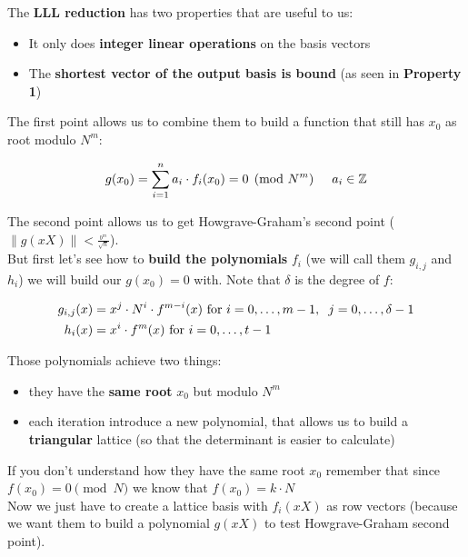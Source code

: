 \documentclass[a4paper,11pt]{article}
\begin{document}
The \textbf{LLL reduction} has two properties that are useful to us:
\begin{itemize}
	\item{It only does \textbf{integer linear operations} on the basis vectors}
	\item{The \textbf{shortest vector of the output basis is bound} (as seen in \textbf{Property 1})}\\
\end{itemize}
The first point allows us to combine them to build a function that still has $x_0$ as root modulo $N^m$:

\[ g(x_0) = \sum^n_{i=1}a_i\cdot f_i(x_0) = 0 \pmod{N^m}\hspace{5mm} a_i \in \mathbb{Z} \]

The second point allows us to get Howgrave-Graham's second point ($\|g(xX)\| < \frac{_{b^m}}{^{\sqrt{n}}}$).\\

But first let's see how to \textbf{build the polynomials} $f_i$ (we will call them $g_{i,j}$ and $h_i$) we will build our $g(x_0) = 0$ with. Note that $\delta$ is the degree of $f$:

\begin{align*}
	g_{i,j}(x) &= x^j \cdot N^i \cdot f^{m-i}(x) \text{ for } i = 0,\hdots,m-1,\hspace{2mm} j=0,\hdots,\delta-1\\
	h_i(x) &= x^i \cdot f^m(x) \text{ for } i = 0,\hdots,t-1
\end{align*}

Those polynomials achieve two things:
\begin{itemize}
	\item{they have the \textbf{same root} $x_0$ but modulo $N^m$}
	\item{each iteration introduce a new polynomial, that allows us to build a \textbf{triangular} lattice (so that the determinant is easier to calculate)}\\
\end{itemize}

If you don't understand how they have the same root $x_0$ remember that since $f(x_0) = 0 \pmod{N}$ we know that $f(x_0) = k \cdot N$\\

Now we just have to create a lattice basis with $f_i(xX)$ as row vectors (because we want them to build a polynomial $g(xX)$ to test Howgrave-Graham second point).\\
\end{document}
